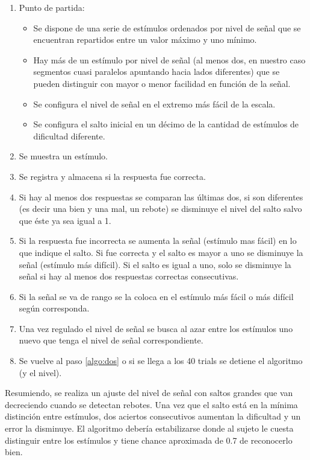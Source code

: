 \documentclass{article}
\numberwithin{figure}{section}
\begin{document}
    \begin{enumerate}
        \item Punto de partida:
        \begin{itemize}
            \item Se dispone de una serie de estímulos ordenados por nivel de señal que se encuentran repartidos entre un valor máximo y uno mínimo. 
            \item Hay más de un estímulo por nivel de señal (al menos dos, en nuestro caso segmentos cuasi paralelos apuntando hacia lados diferentes) que se pueden distinguir con mayor o menor facilidad en función de la señal. 
            \item Se configura el nivel de señal en el extremo más fácil de la escala. 
            \item Se configura el salto inicial en un décimo de la cantidad de estímulos de dificultad diferente.
        \end{itemize}
        \item Se muestra un estímulo. \label{algo:dos}
        \item Se registra y almacena si la respuesta fue correcta.
        \item Si hay al menos dos respuestas se comparan las últimas dos, si son diferentes (es decir una bien y una mal, un rebote) se disminuye el nivel del salto salvo que éste ya sea igual a 1.
        \item Si la respuesta fue incorrecta se aumenta la señal (estímulo mas fácil) en lo que indique el salto. Si fue correcta y el salto es mayor a uno se disminuye la señal (estímulo más difícil). Si el salto es igual a uno, solo se disminuye la señal si hay al menos dos respuestas correctas consecutivas.  
        \item Si la señal se va de rango se la coloca en el estímulo más fácil o más difícil según corresponda. 
        \item Una vez regulado el nivel de señal se busca al azar entre los estímulos uno nuevo que tenga el nivel de señal correspondiente. 
        \item Se vuelve al paso \ref{algo:dos} o si se llega a los 40 trials se detiene el algoritmo (y el nivel).
    \end{enumerate}
    
    Resumiendo, se realiza un ajuste del nivel de señal con saltos grandes que van decreciendo cuando se detectan rebotes. Una vez que el salto está en la mínima distinción entre estímulos, dos aciertos consecutivos aumentan la dificultad y un error la disminuye. El algoritmo debería estabilizarse donde al sujeto le cuesta distinguir entre los estímulos y tiene chance aproximada de 0.7 de reconocerlo bien. 
    
\end{document}
